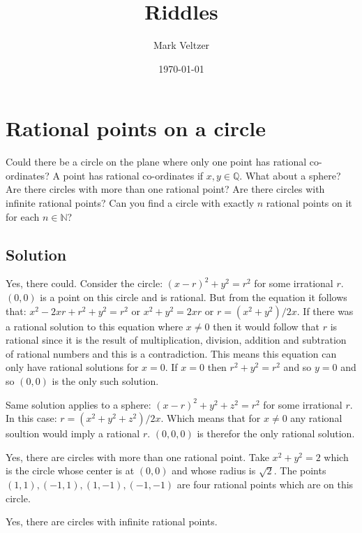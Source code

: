 \documentclass{article}
\title{Riddles}
\author{Mark Veltzer}
\date{\today}
\begin{document}
\maketitle

\tableofcontents

\section{Rational points on a circle}


Could there be a circle on the plane where only one point has rational co-ordinates? A point has rational co-ordinates if $x,y\in\mathbb{Q}$. What about a sphere? Are there circles with more than one rational point? Are there circles with infinite rational points? Can you find a circle with exactly $n$ rational points on it for each $n\in\mathbb{N}$?

\subsection{Solution}

Yes, there could. Consider the circle: $(x-r)^2+y^2=r^2$ for some irrational $r$.
$(0,0)$ is a point on this circle and is rational. But from the equation it follows
that: $x^2-2xr+r^2+y^2=r^2$ or $x^2+y^2=2xr$ or $r=(x^2+y^2)/2x$. If there
was a rational solution to this equation where $x\ne0$ then it would follow that
$r$ is rational since it is the result of multiplication, division, addition and subtration
of rational numbers and this is a contradiction. This means this equation can only
have rational solutions for $x=0$. If $x=0$ then $r^2+y^2=r^2$ and so $y=0$ and so
$(0,0)$ is the only such solution.

Same solution applies to a sphere: $(x-r)^2+y^2+z^2=r^2$ for some irrational $r$.
In this case: $r=(x^2+y^2+z^2)/2x$. Which means that for $x\ne0$ any rational soultion would imply a rational $r$.
$(0,0,0)$ is therefor the only rational solution.

Yes, there are circles with more than one rational point. Take $x^2+y^2=2$ which is the circle whose
center is at $(0,0)$ and whose radius is $\sqrt{2}$. The points $(1,1),(-1,1),(1,-1),(-1,-1)$ are four rational
points which are on this circle.

Yes, there are circles with infinite rational points.
\end{document}
